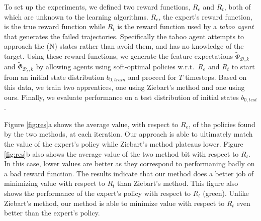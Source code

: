 \documentclass[conference]{IEEEtran}
\begin{document}
To set up the experiments, we defined two reward functions, $R_e$ and $R_t$, both of which are unknown to the learning algorithms.  $R_e$, the expert's reward function, is the true reward function while $R_t$ is the reward function used by a \emph{taboo agent} that generates the failed trajectories. Specifically the taboo agent attempts to approach the (N) states rather than avoid them, and has no knowledge of the target.  Using these reward functions, we generate the feature expectations $\widetilde{\Phi}_{\mathcal{D},k}$ and $\widetilde{\Phi}_{\mathcal{D}_b,k}$ by allowing agents using soft-optimal policies w.r.t.\ $R_e$ and $R_t$ to start from an initial state distribution $b_{0,train}$ and proceed for $T$ timesteps.  Based on this data, we train two apprentices, one using Ziebart's method and one using ours.  Finally, we evaluate performance on a test distribution of initial states $b_{0,test}$. 




Figure \ref{fig:res}a shows the average value, with respect to $R_e$, of the policies found by the two methods, at each iteration.  Our approach is able to ultimately match the value of the expert's policy while Ziebart's method plateaus lower.  Figure \ref{fig:res}b also shows the average value of the two method bit with respect to $R_t$.  In this case, lower values are better as they correspond to performaning badly on a bad reward function.  The results indicate that our method does a better job of minimizing value with respect to $R_t$ than Ziebart's method.  This figure also shows the performance of the expert's policy with respect to $R_t$ (green).  Unlike Ziebart's method, our method is able to minimize value with respect to $R_t$ even better than the expert's policy.
\end{document}
